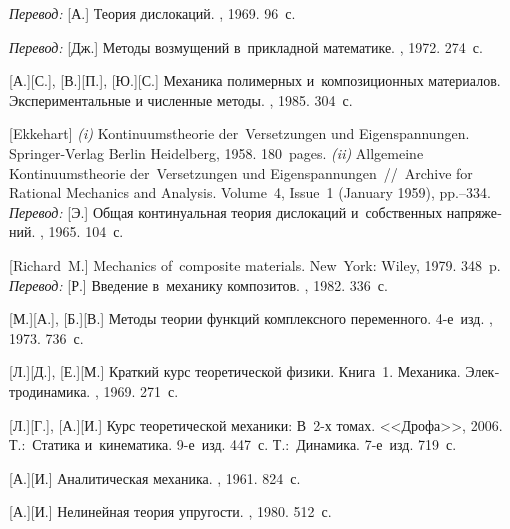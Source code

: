 \begin{thebibliography}{123}
\begin{otherlanguage}{russian}
\emph{Перевод:} [А.] Теория дислокаций. \mirpublisher, 1969. 96~с.

\emph{Перевод:} [Дж.] Методы возмущений в~прикладной математике. \mirpublisher, 1972. 274~с.

[А.][С.], [В.][П.], [Ю.][С.] Механика полимерных и~композиционных материалов. Экспериментальные и численные методы. \naukapublisher, 1985. 304~с.

[Ekkehart] \emph{(i)} Kontinuumstheorie der~Versetzungen und Eigen\-spannung\-en. Springer\hbox{-}Verlag Berlin Heidelberg, 1958. 180~pages.
\emph{(ii)} Allgemeine Kontinuumstheorie der~Versetzungen und Eigen\-span\-nung\-en~//~Archive for Rational Mechanics and Analysis. Volume~4, Issue~1 (January 1959), pp.\hbox{--}334.
\emph{Перевод:} [Э.] Общая континуальная теория дислокаций и~собственных напряжений. \mirpublisher, 1965. 104~с.

[Richard~M.] Mechanics of~composite materials. New~York: Wiley, 1979. 348~p.
\emph{Перевод:} [Р.] Введение в~механику композитов. \mirpublisher, 1982. 336~с.

[М.][А.], [Б.][В.] Методы теории функций комплексного переменного. 4\hbox{-}е~изд. \naukapublisher, 1973. 736~с.

[Л.][Д.], [Е.][М.] Краткий курс теоретической физики. Книга~1. Механика. Электродинамика. \naukapublisher, 1969. 271~с.

[Л.][Г.], [А.][И.] Курс теоретической механики: В~2\hbox{-}х томах. <<Дрофа>>, 2006.
Т.:~Статика и~кинематика. 9\hbox{-}е~изд. 447~с.
Т.:~Динамика. 7\hbox{-}е~изд. 719~с.

[А.][И.] Аналитическая механика. \fizmatgiz, 1961. 824~с.

[А.][И.] Нелинейная теория упругости. \naukapublisher, 1980. 512~с.


\end{otherlanguage}
\end{thebibliography}
